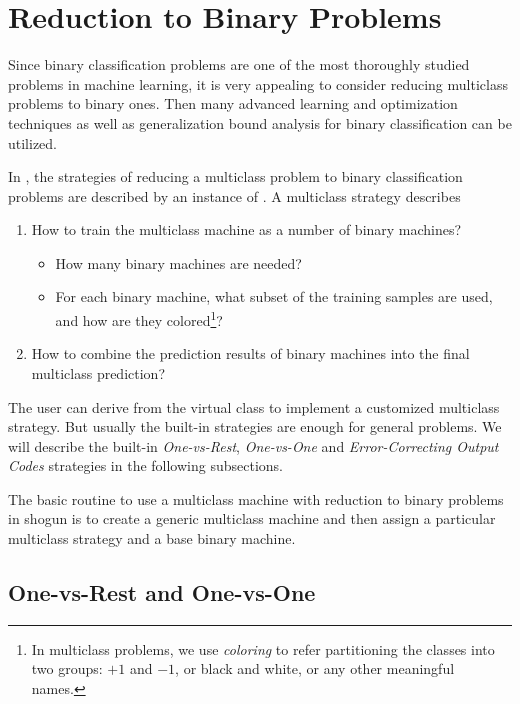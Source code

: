 \section{Reduction to Binary Problems}
\label{sec:multiclass-reduction}

Since binary classification problems are one of the most thoroughly studied
problems in machine learning, it is very appealing to consider reducing
multiclass problems to binary ones. Then many advanced learning and
optimization techniques as well as generalization bound analysis for binary
classification can be utilized.

In \shogun{}, the strategies of reducing a multiclass problem to binary
classification problems are described by an instance of
. A multiclass strategy describes
\begin{enumerate}
\item How to train the multiclass machine as a number of binary machines?
	\begin{itemize}
		\item How many binary machines are needed?
		\item For each binary machine, what subset of the training samples are
			used, and how are they colored\footnote{In multiclass problems, we
				use \emph{coloring} to refer partitioning the classes into two
				groups: $+1$ and $-1$, or black and white, or any other meaningful
				names.}?
	\end{itemize}
\item How to combine the prediction results of binary machines into the final
	multiclass prediction?
\end{enumerate}

The user can derive from the virtual class  to
implement a customized multiclass strategy. But usually the built-in strategies
are enough for general problems. We will describe the built-in \emph{One-vs-Rest},
\emph{One-vs-One} and \emph{Error-Correcting Output Codes} strategies in the
following subsections.

The basic routine to use a multiclass machine with reduction to binary problems
in shogun is to create a generic multiclass machine and then assign a particular
multiclass strategy and a base binary machine.

\subsection{One-vs-Rest and One-vs-One}

